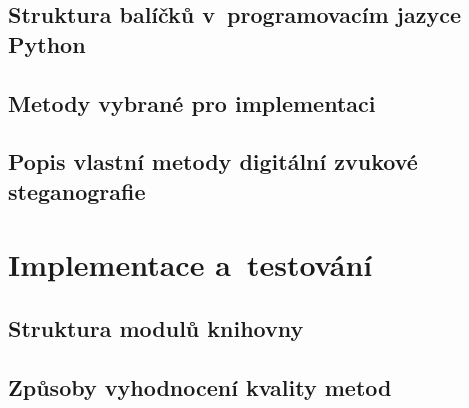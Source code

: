 
\blindtext

\section{Struktura balíčků v~programovacím jazyce Python}
\label{sec:python-package-structure}


\blindtext

\blindtext

\section{Metody vybrané pro implementaci}
\label{sec:chosen-methods}


\blindtext

\blindtext

\section{Popis vlastní metody digitální zvukové steganografie}
\label{sec:own-method}


\blindtext

\blindtext


\chapter{Implementace a~testování}
\label{cha:implementation}


\blindtext

\section{Struktura modulů knihovny}
\label{sec:modules}


\blindtext

\blindtext

\blindtext

\section{Způsoby vyhodnocení kvality metod}
\label{sec:method-quality}

